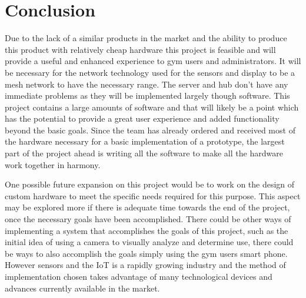 \documentclass[ppfs.tex]{template/subfiles}
\begin{document}
\section{Conclusion}
Due to the lack of a similar products in the market and the ability to produce this product with relatively cheap hardware this project is feasible and will provide a useful and enhanced experience to gym users and administrators. It will be necessary for the network technology used for the sensors and display to be a mesh network to have the necessary range. The server and hub don't have any immediate problems as they will be implemented largely though software. This project contains a large amounts of software and that will likely be a point which has the potential to provide a great user experience and added functionality beyond the basic goals. Since the team has already ordered and received most of the hardware necessary for a basic implementation of a prototype, the largest part of the project ahead is writing all the software to make all the hardware work together in harmony. 

One possible future expansion on this project would be to work on the design of custom hardware to meet the specific needs required for this purpose. This aspect may be explored more if there is adequate time towards the end of the project, once the necessary goals have been accomplished. There could be other ways of implementing a system that accomplishes the goals of this project, such as the initial idea of using a camera to visually analyze and determine use, there could be ways to also accomplish the goals simply using the gym users smart phone. However sensors and the IoT is a rapidly growing industry and the method of implementation chosen takes advantage of many technological devices and advances currently available in the market. 
\end{document}
